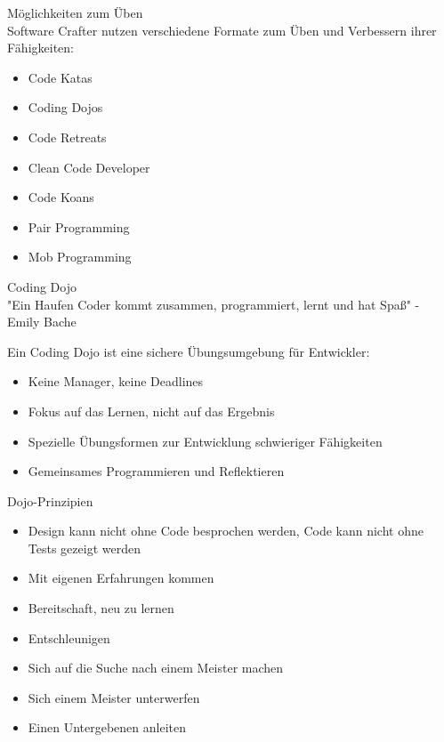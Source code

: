 \begin{concept}{Möglichkeiten zum Üben}\\
    Software Crafter nutzen verschiedene Formate zum Üben und Verbessern ihrer Fähigkeiten:
    \begin{itemize}
        \item Code Katas
        \item Coding Dojos
        \item Code Retreats
        \item Clean Code Developer
        \item Code Koans
        \item Pair Programming
        \item Mob Programming
    \end{itemize}
\end{concept}

\begin{definition}{Coding Dojo}\\
    "Ein Haufen Coder kommt zusammen, programmiert, lernt und hat Spaß" - Emily Bache
    
    Ein Coding Dojo ist eine sichere Übungsumgebung für Entwickler:
    \begin{itemize}
        \item Keine Manager, keine Deadlines
        \item Fokus auf das Lernen, nicht auf das Ergebnis
        \item Spezielle Übungsformen zur Entwicklung schwieriger Fähigkeiten
        \item Gemeinsames Programmieren und Reflektieren
    \end{itemize}
\end{definition}

\begin{concept}{Dojo-Prinzipien}\\
    \begin{itemize}
        \item Design kann nicht ohne Code besprochen werden, Code kann nicht ohne Tests gezeigt werden
        \item Mit eigenen Erfahrungen kommen
        \item Bereitschaft, neu zu lernen
        \item Entschleunigen
        \item Sich auf die Suche nach einem Meister machen
        \item Sich einem Meister unterwerfen
        \item Einen Untergebenen anleiten
    \end{itemize}
\end{concept}

